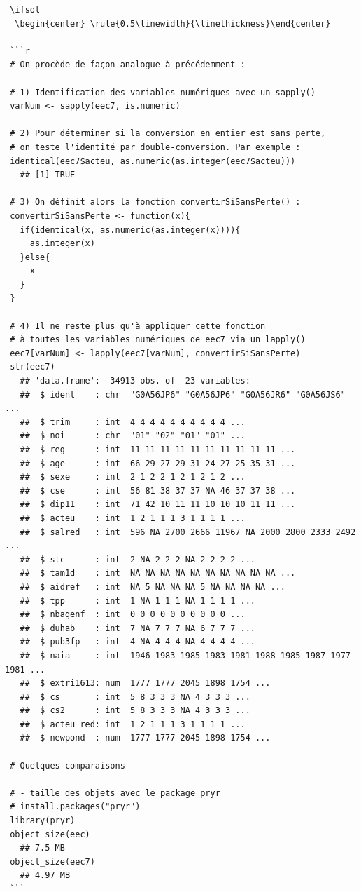 \documentclass[12pt,twosided, notitlepage]{book}
\newif \ifsol
\begin{document}
\begin{enumerate}
\begin{verbatim}
 \ifsol 
  \begin{center} \rule{0.5\linewidth}{\linethickness}\end{center} 

 ```r
 # On procède de façon analogue à précédemment : 

 # 1) Identification des variables numériques avec un sapply()
 varNum <- sapply(eec7, is.numeric)

 # 2) Pour déterminer si la conversion en entier est sans perte, 
 # on teste l'identité par double-conversion. Par exemple : 
 identical(eec7$acteu, as.numeric(as.integer(eec7$acteu)))
   ## [1] TRUE

 # 3) On définit alors la fonction convertirSiSansPerte() : 
 convertirSiSansPerte <- function(x){
   if(identical(x, as.numeric(as.integer(x)))){
     as.integer(x)
   }else{
     x
   }
 }

 # 4) Il ne reste plus qu'à appliquer cette fonction
 # à toutes les variables numériques de eec7 via un lapply()
 eec7[varNum] <- lapply(eec7[varNum], convertirSiSansPerte)
 str(eec7)
   ## 'data.frame':  34913 obs. of  23 variables:
   ##  $ ident    : chr  "G0A56JP6" "G0A56JP6" "G0A56JR6" "G0A56JS6" ...
   ##  $ trim     : int  4 4 4 4 4 4 4 4 4 4 ...
   ##  $ noi      : chr  "01" "02" "01" "01" ...
   ##  $ reg      : int  11 11 11 11 11 11 11 11 11 11 ...
   ##  $ age      : int  66 29 27 29 31 24 27 25 35 31 ...
   ##  $ sexe     : int  2 1 2 2 1 2 1 2 1 2 ...
   ##  $ cse      : int  56 81 38 37 37 NA 46 37 37 38 ...
   ##  $ dip11    : int  71 42 10 11 11 10 10 10 11 11 ...
   ##  $ acteu    : int  1 2 1 1 1 3 1 1 1 1 ...
   ##  $ salred   : int  596 NA 2700 2666 11967 NA 2000 2800 2333 2492 ...
   ##  $ stc      : int  2 NA 2 2 2 NA 2 2 2 2 ...
   ##  $ tam1d    : int  NA NA NA NA NA NA NA NA NA NA ...
   ##  $ aidref   : int  NA 5 NA NA NA 5 NA NA NA NA ...
   ##  $ tpp      : int  1 NA 1 1 1 NA 1 1 1 1 ...
   ##  $ nbagenf  : int  0 0 0 0 0 0 0 0 0 0 ...
   ##  $ duhab    : int  7 NA 7 7 7 NA 6 7 7 7 ...
   ##  $ pub3fp   : int  4 NA 4 4 4 NA 4 4 4 4 ...
   ##  $ naia     : int  1946 1983 1985 1983 1981 1988 1985 1987 1977 1981 ...
   ##  $ extri1613: num  1777 1777 2045 1898 1754 ...
   ##  $ cs       : int  5 8 3 3 3 NA 4 3 3 3 ...
   ##  $ cs2      : int  5 8 3 3 3 NA 4 3 3 3 ...
   ##  $ acteu_red: int  1 2 1 1 1 3 1 1 1 1 ...
   ##  $ newpond  : num  1777 1777 2045 1898 1754 ...

 # Quelques comparaisons

 # - taille des objets avec le package pryr
 # install.packages("pryr")
 library(pryr)
 object_size(eec)
   ## 7.5 MB
 object_size(eec7)
   ## 4.97 MB
 ```


\end{verbatim}
\end{enumerate}
\end{document}
